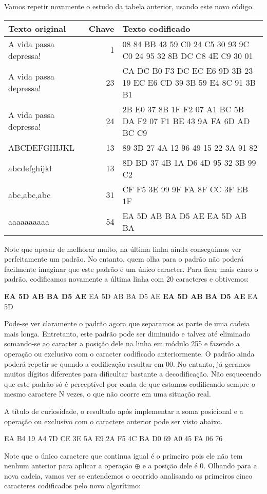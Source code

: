 Vamos repetir novamente o estudo da tabela anterior, usando este novo código.

\begin{tabular}{|l|r|p{8cm}|}
\hline
Texto original&Chave&Texto codificado\\
\hline
A vida passa depressa!&1&08 84 BB 43 59 C0 24 C5 30 93 9C C0 24 95 32 8B DC C8 4E C9 30 01\\
\hline
A vida passa depressa!&23&CA DC B0 F3 DC EC E6 9D 3B 23 19 EC E6 CD 39 3B 59 E4 8C 91 3B B1\\
\hline
A vida passa depressa!&24&2B E0 37 8B 1F F2 07 A1 BC 5B DA F2 07 F1 BE 43 9A FA 6D AD BC C9\\
\hline
ABCDEFGHIJKL&13&89 3D 27 4A 12 96 49 15 22 3A 91 82\\
\hline
abcdefghijkl&13&8D BD 37 4B 1A D6 4D 95 32 3B 99 C2\\
\hline
abc,abc,abc&31&CF F5 3E 99 9F FA 8F CC 3F EB 1F\\
\hline
aaaaaaaaaa&54&EA 5D AB BA D5 AE EA 5D AB BA\\
\hline
\end{tabular}

Note que apesar de melhorar muito, na última linha ainda conseguimos ver perfeitamente um padrão. No entanto, quem olha para o padrão não poderá facilmente imaginar que este padrão é um único caracter. Para ficar mais claro o padrão, codificamos novamente a última linha com 20 caracteres e obtivemos:
\begin{center}
\textbf{EA 5D AB BA D5 AE} EA 5D AB BA D5 AE \textbf{EA 5D AB BA D5 AE} EA 5D\\
\end{center}

Pode-se ver claramente o padrão agora que separamos as parte de uma cadeia mais longa. Entretanto, este padrão pode ser diminuido e talvez até eliminado somando-se ao caracter a posição dele na linha em módulo 255 e fazendo a operação ou exclusivo com o caracter codificado anteriormente. O padrão ainda poderá repetir-se quando a codificação resultar em 00. No entanto, já geramos muitos dígitos diferentes para dificultar bastante a decodificação. Não esquecendo que este  padrão só é perceptível por conta de que estamos codificando sempre o mesmo caractere N vezes, o que não ocorre em uma situação real.

A título de curiosidade, o resultado após implementar a soma posicional e a operação ou exclusivo com o caractere anterior pode ser visto abaixo.
\begin{center}
EA B4 19 A4 7D CE 3E 5A E9 2A F5 4C BA D0 69 A0 45 FA 06 76
\end{center}
Note que o único caractere que continua igual é o primeiro pois ele não tem nenhum anterior para aplicar a operação $ \oplus $ e a posição dele é 0. Olhando para a nova cadeia, vamos ver se entendemos o ocorrido analisando os primeiros cinco caracteres codificados pelo novo algorítimo:

